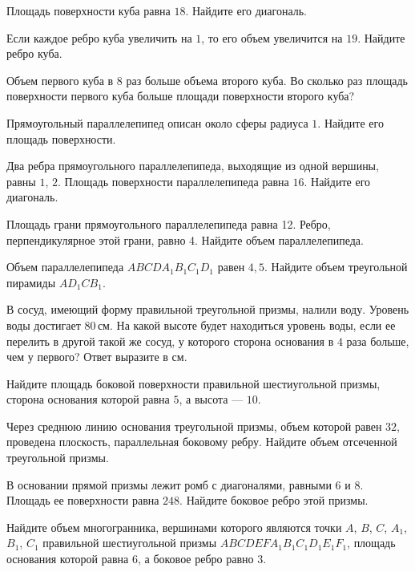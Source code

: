%
%

\begin{class}[number=1]
	\begin{listofex}
		\item Площадь поверхности куба равна \( 18 \). Найдите его диагональ.
		\item Если каждое ребро куба увеличить на \( 1 \), то его объем увеличится на \( 19 \). Найдите ребро куба.
		\item Объем первого куба в \( 8 \) раз больше объема второго куба.
		Во сколько раз площадь поверхности первого куба больше площади поверхности второго куба?
		\item Прямоугольный параллелепипед описан около сферы радиуса \( 1 \). Найдите его площадь поверхности.
		\item Два ребра прямоугольного параллелепипеда, выходящие из одной вершины, равны \( 1 \), \( 2 \).
		Площадь поверхности параллелепипеда равна \( 16 \). Найдите его диагональ.
		\item Площадь грани прямоугольного параллелепипеда равна 12. Ребро, перпендикулярное этой грани, равно 4. Найдите объем параллелепипеда.
		\item Объем параллелепипеда \( ABCDA_1B_1C_1D_1 \) равен \( 4,5 \). Найдите объем треугольной пирамиды \( AD_1CB_1 \).
		\item В сосуд, имеющий форму правильной треугольной призмы, налили воду. Уровень воды достигает \( 80 \) см. На какой высоте будет находиться уровень воды, если ее перелить в другой такой же сосуд, у которого сторона основания в \( 4 \) раза больше, чем у первого? Ответ выразите в см.
		\item Найдите площадь боковой поверхности правильной шестиугольной призмы, сторона основания которой равна \( 5 \), а высота  --- \( 10 \).
		\item Через среднюю линию основания треугольной призмы, объем которой равен \( 32 \), проведена плоскость, параллельная боковому ребру.
		Найдите объем отсеченной треугольной призмы.
		\item В основании прямой призмы лежит ромб с диагоналями, равными \( 6 \) и \( 8 \). Площадь ее поверхности равна \( 248 \).
		Найдите боковое ребро этой призмы.
		\item Найдите объем многогранника, вершинами которого являются точки \( A \), \( B \), \( C \), \( A_1 \), \( B_1 \), \( C_1 \) правильной шестиугольной призмы \( ABCDEFA_1B_1C_1D_1E_1F_1 \), площадь основания которой равна \( 6 \), а боковое ребро равно \( 3 \).

\end{listofex}
\end{class}

